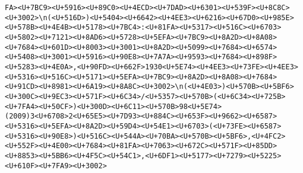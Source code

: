 \documentclass[
]{article}
\begin{document}
\begin{verbatim}
FA><U+7BC9><U+5916><U+89C0><U+4ECD><U+7DAD><U+6301><U+539F><U+8C8C><U+3002>\n(<U+516D>)<U+5404><U+6642><U+4EE3><U+6216><U+67D0><U+985E><U+578B><U+4E4B><U+5178><U+7BC4>:<U+81FA><U+5317><U+516C><U+6703><U+5802><U+7121><U+8AD6><U+5728><U+5EFA><U+7BC9><U+8A2D><U+8A08><U+7684><U+601D><U+8003><U+3001><U+8A2D><U+5099><U+7684><U+6574><U+5408><U+3001><U+5916><U+90E8><U+7A7A><U+9593><U+7684><U+898F><U+5283><U+4E0A>,<U+90FD><U+662F>1930<U+5E74><U+4EE3><U+73FE><U+4EE3><U+5316><U+516C><U+5171><U+5EFA><U+7BC9><U+8A2D><U+8A08><U+7684><U+91CD><U+8981><U+6A19><U+8A8C><U+3002>\n(<U+4E03>)<U+570B><U+5BF6><U+300C><U+9EC3><U+571F><U+6C34>/<U+5357><U+570B>(<U+6C34><U+725B><U+7FA4><U+50CF>)<U+300D><U+6C11><U+570B>98<U+5E74>(2009)3<U+6708>2<U+65E5><U+7D93><U+884C><U+653F><U+9662><U+6587><U+5316><U+5EFA><U+8A2D><U+59D4><U+54E1><U+6703>(<U+73FE><U+6587><U+5316><U+90E8>)<U+516C><U+544A><U+70BA><U+570B><U+5BF6>,<U+4FC2><U+552F><U+4E00><U+7684><U+81FA><U+7063><U+672C><U+571F><U+85DD><U+8853><U+5BB6><U+4F5C><U+54C1>,<U+6DF1><U+5177><U+7279><U+5225><U+610F><U+7FA9><U+3002>

\end{verbatim}
\end{document}
